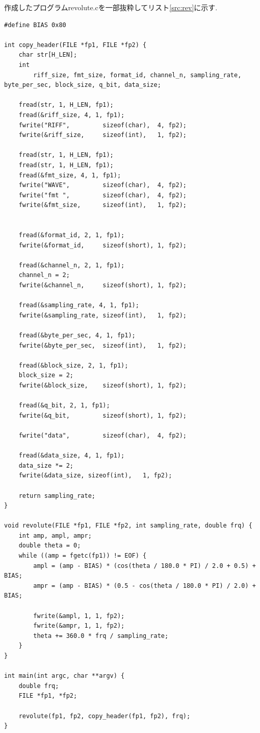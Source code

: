 \documentclass[titlepage]{jsarticle}
\begin{document}
    作成したプログラムrevolute.cを一部抜粋してリスト\ref{src:rev}に示す.
    
    \begin{lstlisting}[caption=revolute.c, label=src:rev]
#define BIAS 0x80

int copy_header(FILE *fp1, FILE *fp2) {
    char str[H_LEN];
    int
        riff_size, fmt_size, format_id, channel_n, sampling_rate, byte_per_sec, block_size, q_bit, data_size;

    fread(str, 1, H_LEN, fp1);
    fread(&riff_size, 4, 1, fp1);
    fwrite("RIFF",         sizeof(char),  4, fp2);
    fwrite(&riff_size,     sizeof(int),   1, fp2);

    fread(str, 1, H_LEN, fp1);
    fread(str, 1, H_LEN, fp1);
    fread(&fmt_size, 4, 1, fp1);
    fwrite("WAVE",         sizeof(char),  4, fp2);
    fwrite("fmt ",         sizeof(char),  4, fp2);
    fwrite(&fmt_size,      sizeof(int),   1, fp2);


    fread(&format_id, 2, 1, fp1);
    fwrite(&format_id,     sizeof(short), 1, fp2);

    fread(&channel_n, 2, 1, fp1);
    channel_n = 2;
    fwrite(&channel_n,     sizeof(short), 1, fp2);

    fread(&sampling_rate, 4, 1, fp1);
    fwrite(&sampling_rate, sizeof(int),   1, fp2);

    fread(&byte_per_sec, 4, 1, fp1);
    fwrite(&byte_per_sec,  sizeof(int),   1, fp2);

    fread(&block_size, 2, 1, fp1);
    block_size = 2;
    fwrite(&block_size,    sizeof(short), 1, fp2);

    fread(&q_bit, 2, 1, fp1);
    fwrite(&q_bit,         sizeof(short), 1, fp2);

    fwrite("data",         sizeof(char),  4, fp2);

    fread(&data_size, 4, 1, fp1);
    data_size *= 2;
    fwrite(&data_size, sizeof(int),   1, fp2);

    return sampling_rate;
}

void revolute(FILE *fp1, FILE *fp2, int sampling_rate, double frq) {
    int amp, ampl, ampr;
    double theta = 0;
    while ((amp = fgetc(fp1)) != EOF) {
        ampl = (amp - BIAS) * (cos(theta / 180.0 * PI) / 2.0 + 0.5) + BIAS;
        ampr = (amp - BIAS) * (0.5 - cos(theta / 180.0 * PI) / 2.0) + BIAS;

        fwrite(&ampl, 1, 1, fp2);
        fwrite(&ampr, 1, 1, fp2);
        theta += 360.0 * frq / sampling_rate;
    }
}

int main(int argc, char **argv) {
    double frq;
    FILE *fp1, *fp2;

    revolute(fp1, fp2, copy_header(fp1, fp2), frq);
}\end{lstlisting}
\end{document}
